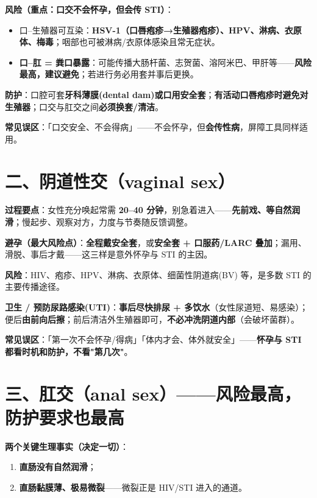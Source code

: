 \documentclass[12pt,UTF8,openany]{ctexbook}
\begin{document}
\textbf{风险（重点：口交不会怀孕，但会传 STI）}：
\begin{itemize}[leftmargin=2em,itemsep=0.3em]
  \item 口--生殖器可互染：\textbf{HSV-1（口唇疱疹→生殖器疱疹）、HPV、淋病、衣原体、梅毒}；咽部也可被淋病/衣原体感染且常无症状。
  \item \textbf{口--肛 = 粪口暴露}：可能传播大肠杆菌、志贺菌、溶阿米巴、甲肝等——\textbf{风险最高，建议避免}；若进行务必用套并事后更换。
\end{itemize}

\textbf{防护}：口腔可套\textbf{牙科薄膜(dental dam)或口用安全套}；\textbf{有活动口唇疱疹时避免对生殖器}；口交与肛交之间\textbf{必须换套/清洁}。

\textbf{常见误区}：「口交安全、不会得病」——不会怀孕，但\textbf{会传性病}，屏障工具同样适用。

\section{二、阴道性交（vaginal sex）}

\textbf{过程要点}：女性充分唤起常需 \textbf{20--40 分钟}，别急着进入——\textbf{先前戏、等自然润滑}；慢起步、观察对方，力度与节奏随反馈调整。

\textbf{避孕（最大风险点）}：\textbf{全程戴安全套}，或\textbf{安全套 + 口服药/LARC 叠加}；漏用、滑脱、事后才戴——这三样是意外怀孕与 STI 的主因。

\textbf{风险}：HIV、疱疹、HPV、淋病、衣原体、细菌性阴道病(BV) 等，是多数 STI 的主要传播途径。

\textbf{卫生 / 预防尿路感染(UTI)}：\textbf{事后尽快排尿 + 多饮水}（女性尿道短、易感染）；便后\textbf{由前向后擦}；前后清洁外生殖器即可，\textbf{不必冲洗阴道内部}（会破坏菌群）。

\textbf{常见误区}：「第一次不会怀孕/得病」「体内才会、体外就安全」——\textbf{怀孕与 STI 都看时机和防护，不看"第几次"}。

\section{三、肛交（anal sex）——风险最高，防护要求也最高}

\textbf{两个关键生理事实（决定一切）}：
\begin{enumerate}[leftmargin=2em,itemsep=0.3em]
  \item \textbf{直肠没有自然润滑}；
  \item \textbf{直肠黏膜薄、极易微裂}——微裂正是 HIV/STI 进入的通道。
\end{enumerate}
\end{document}
